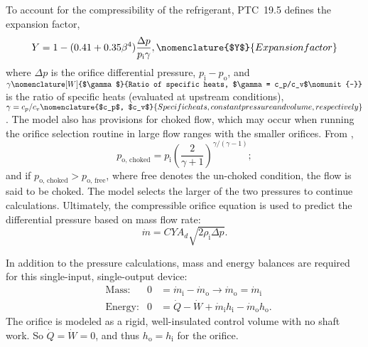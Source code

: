 To account for the compressibility of the refrigerant, PTC~19.5 defines
the expansion factor,
\begin{equation}
Y = 1 - (0.41 + 0.35 \beta^4) \frac{\Delta p}{p_{\text{i}}\gamma},
\nomenclature{$Y$}{Expansion factor\nomunit{-}}
\end{equation}
where $\Delta p$ is the orifice differential pressure, $p_{\text{i}}-p_{\text{o}}$, and
$\gamma\nomenclature[W]{$\gamma$}{Ratio of specific heats, $\gamma = c_p/c_v$\nomunit{-}}$ 
is the ratio of specific heats (evaluated at upstream conditions), 
$\gamma = c_p/c_v\nomenclature{$c_p$, $c_v$}{Specific heats, constant pressure and volume, respectively\nomunit{\btu\per\poundmass\rankine}}$.
%
%
%
%
%
The model also has provisions for choked flow, which may occur when 
running the orifice selection routine in large flow ranges with the smaller orifices.
From \textcite{munson2009}, 
\begin{equation}
p_{\text{o, choked}} = p_{\text{i}} \left(\frac{2}{\gamma+1}\right)^{\gamma/(\gamma-1)};
\end{equation}
and if $p_{\text{o, choked}} > p_{\text{o, free}}$, where free denotes the un-choked condition, the flow is said to be choked.
The model selects the larger of the two pressures to continue calculations.
Ultimately, the compressible orifice equation is used to predict the differential pressure based on mass flow rate:
\begin{equation}
\dot{m} = C Y A_d \sqrt{2\rho_{\text{i}} \Delta p}.
\end{equation}

In addition to the pressure calculations, mass and energy balances are required
for this single-input, single-output device:
\begin{align}
  &\text{Mass:}   & 0 &= {\dot{m}_{\text{i}}} - {\dot{m}_{\text{o}}} \to {\dot{m}_{\text{o}}} = {\dot{m}_{\text{i}}} \label{eqn:OrifMass}\\
  &\text{Energy:} & 0 &= \dot{Q} - \dot{W} + {\dot{m}_{\text{i}}h_{\text{i}}} - 
		{\dot{m}_{\text{o}}h_{\text{o}}} \label{eqn:OrifEnergy}.
\end{align}
The orifice is modeled as a rigid, well-insulated control volume with no shaft work. 
So $\dot{Q}=\dot{W}=0$, and thus $h_{\text{o}} = h_{\text{i}}$ for the orifice.

